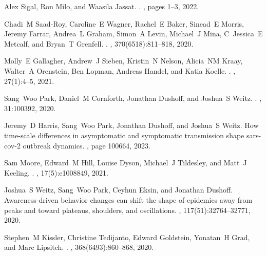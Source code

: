\documentclass[12pt]{article}
\begin{document}
\begin{thebibliography}{10}
Alex Sigal, Ron Milo, and Waasila Jassat.
.
, pages 1--3, 2022.

Chadi~M Saad-Roy, Caroline~E Wagner, Rachel~E Baker, Sinead~E Morris, Jeremy
  Farrar, Andrea~L Graham, Simon~A Levin, Michael~J Mina, C~Jessica~E Metcalf,
  and Bryan~T Grenfell.
.
, 370(6518):811--818, 2020.

Molly~E Gallagher, Andrew~J Sieben, Kristin~N Nelson, Alicia~NM Kraay, Walter~A
  Orenstein, Ben Lopman, Andreas Handel, and Katia Koelle.
.
, 27(1):4--5, 2021.

Sang~Woo Park, Daniel~M Cornforth, Jonathan Dushoff, and Joshua~S Weitz.
.
, 31:100392, 2020.

Jeremy~D Harris, Sang~Woo Park, Jonathan Dushoff, and Joshua~S Weitz.
\newblock How time-scale differences in asymptomatic and symptomatic
  transmission shape sars-cov-2 outbreak dynamics.
, page 100664, 2023.

Sam Moore, Edward~M Hill, Louise Dyson, Michael~J Tildesley, and Matt~J
  Keeling.
.
, 17(5):e1008849, 2021.

Joshua~S Weitz, Sang~Woo Park, Ceyhun Eksin, and Jonathan Dushoff.
\newblock Awareness-driven behavior changes can shift the shape of epidemics
  away from peaks and toward plateaus, shoulders, and oscillations.
,
  117(51):32764--32771, 2020.

Stephen~M Kissler, Christine Tedijanto, Edward Goldstein, Yonatan~H Grad, and
  Marc Lipsitch.
.
, 368(6493):860--868, 2020.


\end{thebibliography}
\end{document}
